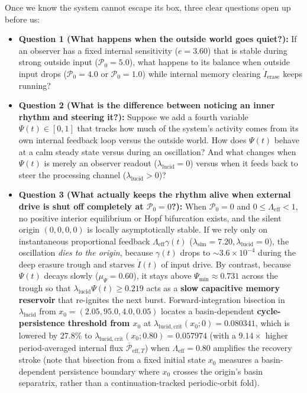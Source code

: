 \documentclass[11pt,a4paper]{article}
\theoremstyle{definition}
\begin{document}
Once we know the system cannot escape its box, three clear questions open up before us:
\begin{itemize}
  \item \textbf{Question 1 (What happens when the outside world goes quiet?):} If an observer has a fixed internal sensitivity ($e = 3.60$) that is stable during strong outside input ($\mathcal{P}_0 = 5.0$), what happens to its balance when outside input drops ($\mathcal{P}_0 = 4.0$ or $\mathcal{P}_0 = 1.0$) while internal memory clearing $\dot{I}_{\mathrm{erase}}$ keeps running?
  \item \textbf{Question 2 (What is the difference between noticing an inner rhythm and steering it?):} Suppose we add a fourth variable $\Psi(t) \in [0, 1]$ that tracks how much of the system's activity comes from its own internal feedback loop versus the outside world. How does $\Psi(t)$ behave at a calm steady state versus during an oscillation? And what changes when $\Psi(t)$ is merely an observer readout ($\lambda_{\mathrm{lucid}} = 0$) versus when it feeds back to steer the processing channel ($\lambda_{\mathrm{lucid}} > 0$)?
  \item \textbf{Question 3 (What actually keeps the rhythm alive when external drive is shut off completely at $\mathcal{P}_0 = 0$?):} When $\mathcal{P}_0 = 0$ and $0 \le \Lambda_{\mathrm{eff}} < 1$, no positive interior equilibrium or Hopf bifurcation exists, and the silent origin $(0,0,0,0)$ is locally asymptotically stable. If we rely only on instantaneous proportional feedback $\Lambda_{\mathrm{eff}}\gamma(t)$ ($\lambda_{\mathrm{sim}} = 7.20, \lambda_{\mathrm{lucid}} = 0$), the oscillation \emph{dies to the origin}, because $\gamma(t)$ drops to $\sim 3.6 \times 10^{-4}$ during the deep erasure trough and starves $\dot{I}(t)$ of input drive. By contrast, because $\Psi(t)$ decays slowly ($\mu_\Psi = 0.60$), it stays above $\Psi_{\min} \approx 0.731$ across the trough so that $\lambda_{\mathrm{lucid}}\Psi(t) \ge 0.219$ acts as a \textbf{slow capacitive memory reservoir} that re-ignites the next burst. Forward-integration bisection in $\lambda_{\mathrm{lucid}}$ from $x_0 = (2.05, 95.0, 4.0, 0.05)$ locates a basin-dependent \textbf{cycle-persistence threshold from $x_0$} at $\lambda_{\mathrm{lucid,crit}}(x_0; 0) = 0.080341$, which is lowered by $27.8\%$ to $\lambda_{\mathrm{lucid,crit}}(x_0; 0.80) = 0.057974$ (with a $9.14\times$ higher period-averaged internal flux $\overline{\mathcal{P}}_{\mathrm{eff},T}$) when $\Lambda_{\mathrm{eff}} = 0.80$ amplifies the recovery stroke (note that bisection from a fixed initial state $x_0$ measures a basin-dependent persistence boundary where $x_0$ crosses the origin's basin separatrix, rather than a continuation-tracked periodic-orbit fold).
\end{itemize}
\end{document}
